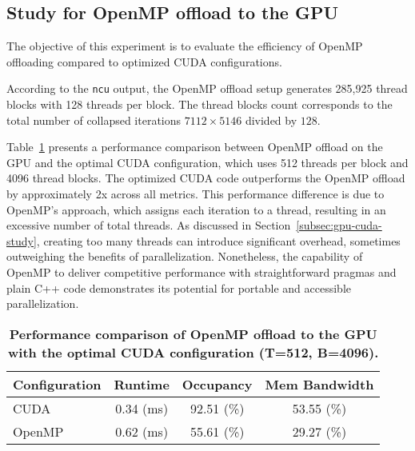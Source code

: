 \subsection{Study for OpenMP offload to the GPU}
\label{subsec:gpu-omp-study}

The objective of this experiment is to evaluate the efficiency of OpenMP offloading compared to optimized CUDA configurations.

According to the \texttt{ncu} output, the OpenMP offload setup generates 285,925 thread blocks with 128 threads per block. The thread blocks count corresponds to the total number of collapsed iterations \(7112 \times 5146\) divided by \(128\).

Table~\ref{tab:omp-offload-comparison} presents a performance comparison between OpenMP offload on the GPU and the optimal CUDA configuration, which uses 512 threads per block and 4096 thread blocks. The optimized CUDA code outperforms the OpenMP offload by approximately 2x across all metrics. This performance difference is due to OpenMP’s approach, which assigns each iteration to a thread, resulting in an excessive number of total threads. As discussed in Section~\ref{subsec:gpu-cuda-study}, creating too many threads can introduce significant overhead, sometimes outweighing the benefits of parallelization. Nonetheless, the capability of OpenMP to deliver competitive performance with straightforward pragmas and plain C++ code demonstrates its potential for portable and accessible parallelization.

\begin{table}[htbp]
    \centering
    \begin{tabular}{l|c|c|c}
        Configuration & Runtime & Occupancy & Mem Bandwidth\\
        \hline
        CUDA & 0.34 (ms) & 92.51 (\%) & 53.55 (\%) \\
        OpenMP & 0.62 (ms) & 55.61 (\%) & 29.27 (\%) \\
    \end{tabular}
    \caption{\textbf{Performance comparison of OpenMP offload to the GPU with the optimal CUDA configuration (T=512, B=4096).}}
    \label{tab:omp-offload-comparison}
\end{table}
